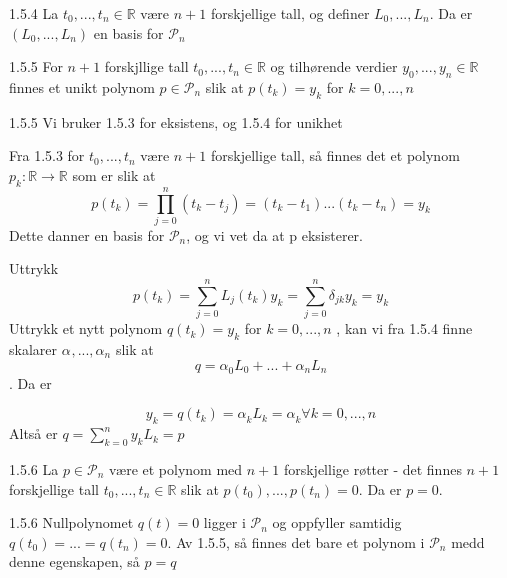 \documentclass[a4paper,norsk]{article}
\begin{document}
\begin{propositionbox}{1.5.4}{}
La $ t_0, ..., t_n \in \mathbb{R} $ være $ n+1 $ forskjellige tall, og definer $ L_0, ..., L_n $. Da er $ \left( L_0, ..., L_n \right)  $ en basis for $ \mathcal{P}_n $ 
\end{propositionbox}

\begin{corollarybox}{1.5.5}{}
For $ n+1 $ forskjllige tall $ t_0, ..., t_n \in \mathbb{R} $ og tilhørende verdier $ y_0, ..., y_n \in \mathbb{R} $ finnes et unikt polynom $ p \in \mathcal{P}_n $ slik at $p(t_k) = y_k $ for $ k=0, ..., n $ 



\begin{proofbox}{1.5.5}{}
Vi bruker 1.5.3 for eksistens, og 1.5.4 for unikhet

Fra 1.5.3 for $ t_0, ..., t_n $ være $ n+1 $ forskjellige tall, så finnes det et polynom $ p_k :\mathbb{R} \rightarrow \mathbb{R} $ som er  slik at
\[
    p(t_k) = \prod_{j=0}^{n} \left( t_k - t_j \right) = \left( t_k - t_1 \right) ... \left( t_k - t_n \right) = y_k
\]
Dette danner en basis for $ \mathcal{P}_n $, og vi vet da at p eksisterer.

Uttrykk 
\[
    p(t_k) = \sum_{ j=0 }^{ n } L_j(t_k) y_k = \sum_{ j=0 }^{ n } \delta_{jk} y_k = y_k
\]
Uttrykk et nytt polynom $ q(t_k) = y_k $ for $ k=0, ..., n $ , kan vi fra 1.5.4 finne skalarer $ \alpha_{}^{}, ..., \alpha_{n}^{} $ slik at 
\[
    q = \alpha_{0}^{} L_0 + ...  + \alpha_{n}^{} L_n
\]. Da er

\[
    y_k = q(t_k) = \alpha_{k}^{} L_k = \alpha_{k}^{} \forall k=0, ..., n
\]
Altså er $ q = \sum_{ k=0 }^{ n } y_kL_k = p $ 

 
\end{proofbox}
\end{corollarybox}

\begin{corollarybox}{1.5.6}{}
La $ p \in  \mathcal{P}_n $ være et polynom med $ n+1 $ forskjellige røtter - det finnes $ n+1 $ forskjellige tall $ t_0, ..., t_n \in \mathbb{R}$ slik at $ p(t_0), ..., p(t_n)=0 $. Da er $ p=0 $.

\begin{proofbox}{1.5.6}{}
Nullpolynomet $ q(t) = 0 $ ligger i $ \mathcal{P}_n $ og oppfyller samtidig $ q(t_0) = ... = q(t_n) = 0 $. Av 1.5.5, så finnes det bare et polynom i $ \mathcal{P}_n $  medd denne egenskapen, så $ p=q $ 
\end{proofbox}
\end{corollarybox}
\end{document}
